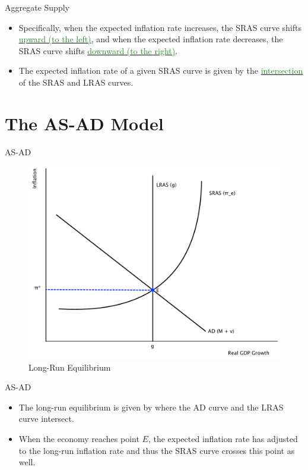 \documentclass[xcolor={dvipsnames},pdf, hyperref={colorlinks=true, citecolor=ForestGreen, linkcolor=BlueViolet, urlcolor=Magenta}]{beamer}
\theoremstyle{definition}
\newcommand{\dd}[1]{{\underline{\textcolor{ForestGreen}{#1}}}}
\begin{document}
\begin{frame}{Aggregate Supply}
\begin{itemize}

	\item Specifically, when the expected inflation rate increases, the SRAS curve shifts \dd{upward (to the left)}, and when the expected inflation rate decreases, the SRAS curve shifts \dd{downward (to the right)}.
	\item The expected inflation rate of a given SRAS curve is given by the \dd{intersection} of the SRAS and LRAS curves.
	
\end{itemize}
\end{frame}
\section{The AS-AD Model}


\begin{frame}{AS-AD}
	
	\begin{figure}[H]
		\centering
		\includegraphics[scale=.35]{plot98.pdf}
		\caption{Long-Run Equilibrium}
	\end{figure}
	

\end{frame}


\begin{frame}{AS-AD}
\begin{itemize}
	\item The long-run equilibrium is given by where the AD curve and the LRAS curve intersect. 
	\item When the economy reaches point $E$, the expected inflation rate has adjusted to the long-run inflation rate and thus the SRAS curve crosses this point as well.
\end{itemize}
\end{frame}
\end{document}
